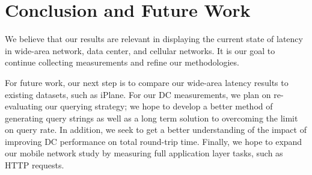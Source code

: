\section{Conclusion and Future Work}
\label{sec:conclusion}

We believe that our results are relevant in displaying the current state of latency in wide-area network, data center, and cellular networks. It is our goal to continue collecting measurements and refine our methodologies. 

For future work, our next step is to compare our wide-area latency results to existing datasets, such as iPlane. For our DC measurements, we plan on re-evaluating our querying strategy; we hope to develop a better method of generating query strings as well as a long term solution to overcoming the limit on query rate. In addition, we seek to get a better understanding of the impact of improving DC performance on total round-trip time. Finally, we hope to expand our mobile network study by measuring full application layer tasks, such as HTTP requests.


